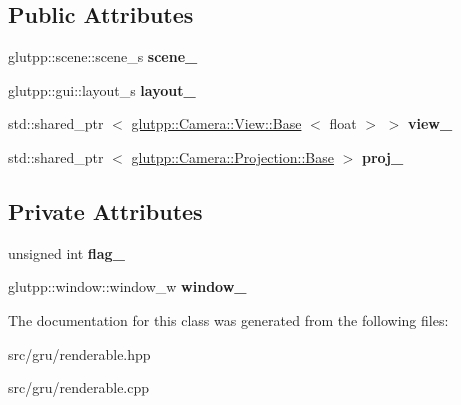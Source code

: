\subsection*{\-Public \-Attributes}
\begin{DoxyCompactItemize}
\item 
\hypertarget{classglutpp_1_1renderable_a0ef0de3f255d8f8e249ba797609b6dc8}{glutpp\-::scene\-::scene\-\_\-s {\bfseries scene\-\_\-}}\label{classglutpp_1_1renderable_a0ef0de3f255d8f8e249ba797609b6dc8}

\item 
\hypertarget{classglutpp_1_1renderable_a9f2091a43a07d3f8404e89abb578f94f}{glutpp\-::gui\-::layout\-\_\-s {\bfseries layout\-\_\-}}\label{classglutpp_1_1renderable_a9f2091a43a07d3f8404e89abb578f94f}

\item 
\hypertarget{classglutpp_1_1renderable_a686f3edea2d0b8185af7b7a4980c963c}{std\-::shared\-\_\-ptr\*
$<$ \hyperlink{classglutpp_1_1Camera_1_1View_1_1Base}{glutpp\-::\-Camera\-::\-View\-::\-Base}\*
$<$ float $>$ $>$ {\bfseries view\-\_\-}}\label{classglutpp_1_1renderable_a686f3edea2d0b8185af7b7a4980c963c}

\item 
\hypertarget{classglutpp_1_1renderable_abec5a61663b6052169f2bd8fe9611b90}{std\-::shared\-\_\-ptr\*
$<$ \hyperlink{classglutpp_1_1Camera_1_1Projection_1_1Base}{glutpp\-::\-Camera\-::\-Projection\-::\-Base} $>$ {\bfseries proj\-\_\-}}\label{classglutpp_1_1renderable_abec5a61663b6052169f2bd8fe9611b90}

\end{DoxyCompactItemize}
\subsection*{\-Private \-Attributes}
\begin{DoxyCompactItemize}
\item 
\hypertarget{classglutpp_1_1renderable_a788aa725277a26a52b34b0be8aeeab1e}{unsigned int {\bfseries flag\-\_\-}}\label{classglutpp_1_1renderable_a788aa725277a26a52b34b0be8aeeab1e}

\item 
\hypertarget{classglutpp_1_1renderable_ad6c8fdaf4b752258ce5a8fa94ffff7f0}{glutpp\-::window\-::window\-\_\-w {\bfseries window\-\_\-}}\label{classglutpp_1_1renderable_ad6c8fdaf4b752258ce5a8fa94ffff7f0}

\end{DoxyCompactItemize}


\-The documentation for this class was generated from the following files\-:\begin{DoxyCompactItemize}
\item 
src/gru/renderable.\-hpp\item 
src/gru/renderable.\-cpp\end{DoxyCompactItemize}
